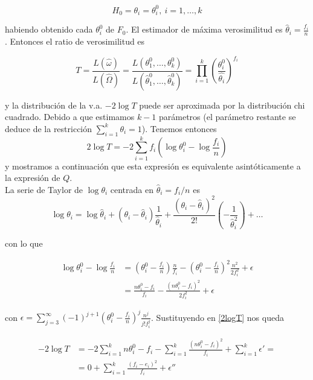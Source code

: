 	\[ H_0 = \theta_i = \theta_i^0,\ i = 1, \dots, k \]
	 
	habiendo obtenido cada $\theta_i^0$ de $F_0$. El 
estimador de máxima verosimilitud es $\hat{\theta}_i = 
\frac{f_i}{n}$. Entonces el ratio de verosimilitud es
	 
	 \[ 
	 T = \frac{L(\hat{\omega})}{L(\hat{\Omega})}
	   = \frac{L(\theta_1^0, \dots, \theta_k^0)}
	   		{L(\hat{\theta}_1^0, \dots, \hat{\theta}_k^0)}
	   = \prod\limits_{i=1}^k
	   		\left( 
	 			\frac{\theta_i^0}{\hat{\theta_i}} 
	 		\right)^{f_i}
	 \]
	 
	 y la distribución de la v.a. $-2 \log T$ puede ser 
aproximada por la distribución chi cuadrado. Debido a que 
estimamos $k-1$ parámetros (el parámetro restante se deduce 
de la restricción $\sum\limits_{i=1}^k \theta_i = 1$). 
Tenemos entonces
	 \begin{equation}
	 2 \log T = 
	 		-2 \sum\limits_{i=1}^k
	 			f_i \left(
	 					\log \theta_i^0 - \log \frac{f_i}{n}
	 				\right)
	 \label{2logT}
	 \end{equation}
	y mostramos a continuación que esta expresión es 
equivalente asintóticamente a la expresión de $Q$.\\
	
	La serie de Taylor de $\log \theta_i$ centrada en 
$\hat{\theta}_i = f_i/n$ es
	\[ \log \theta_i = 
			\log \hat{\theta}_i +
			(\theta_i - \hat{\theta}_i)
				\frac{1}{\hat{\theta}_i} +
			\frac{(\theta_i - \hat{\theta}_i)^2}{2!}
				\left(-\frac{1}{\hat{\theta}_i^2}\right) +
			\dots
	\]
	
	con lo que
	
	\begin{align*}	
	 \log \theta_i^0 - \log \frac{f_i}{n} & = 
			\left(
				\theta_i^0 - \frac{f_i}{n}
			\right) \frac{n}{f_i} -
			\left(
				\theta_i^0 - \frac{f_i}{n}
			\right)^2 \frac{n^2}{2f_i^2} + \epsilon \\
		&= \frac{n\theta_i^0 - f_i}{f_i} -
			\frac{(n\theta_i^0 - f_i)^2}{2f_i^2} +\epsilon
	\end{align*}
	
	con $\epsilon = \sum\limits_{j=3}^\infty
			(-1)^{j+1} 
			\left( \theta_i^0 - \frac{f_i}{n}\right)^j
			\frac{n^j}{j!f_i^j}$. Sustituyendo en \ref{2logT} 
nos queda
			
	\begin{align*}
	-2 \log T &= 
		-2 \sum\limits_{i=1}^k n\theta_i^0 - f_i -
		\sum\limits_{i=1}^k 
			\frac{(n\theta_i^0 - f_i)^2}{f_i} + 
		\sum\limits_{i=1}^k \epsilon' = \\
	&= 0 + 
	   \sum\limits_{i=1}^k \frac{(f_i-e_i)^2}{f_i} +
	   \epsilon''	
	\end{align*}	 
	
